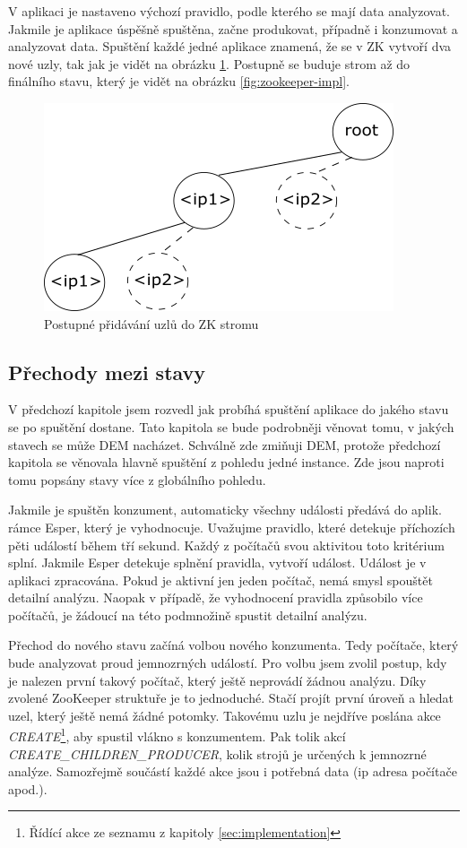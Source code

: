 \documentclass[
  digital, %
  table,   %
  nolof,     %
  nolot,     %
  oneside, %
  nocover,
  monochrome,
  12pt
]{fithesis3}
\begin{document}
V aplikaci je nastaveno výchozí pravidlo, podle kterého se mají data analyzovat. Jakmile je aplikace úspěšně spuštěna, začne produkovat, případně i konzumovat a analyzovat data. Spuštění každé jedné aplikace znamená, že se v ZK vytvoří dva nové uzly, tak jak je vidět na obrázku  \ref{fig:app-start}. Postupně se buduje strom až do finálního stavu, který je vidět na obrázku \ref{fig:zookeeper-impl}.

\begin{figure}[H]
	\centering
    \includegraphics[width=.4\linewidth, height=.18\textheight]{images/app-start.png}
    \caption{Postupné přidávání uzlů do ZK stromu}
    \label{fig:app-start}
\end{figure}

\subsection{Přechody mezi stavy}
V předchozí kapitole jsem rozvedl jak probíhá spuštění aplikace do jakého stavu se po spuštění dostane. Tato kapitola se bude podrobněji věnovat tomu, v jakých stavech se může DEM nacházet. Schválně zde zmiňuji DEM, protože předchozí kapitola se věnovala hlavně spuštění z pohledu jedné instance. Zde jsou naproti tomu popsány stavy více z globálního pohledu.

Jakmile je spuštěn konzument, automaticky všechny události předává do aplik. rámce Esper, který je vyhodnocuje. Uvažujme pravidlo, které detekuje příchozích pěti událostí během tří sekund. Každý z počítačů svou aktivitou toto kritérium splní. Jakmile Esper detekuje splnění pravidla, vytvoří událost. Událost je v aplikaci zpracována. Pokud je aktivní jen jeden počítač, nemá smysl spouštět detailní analýzu. Naopak v případě, že vyhodnocení pravidla způsobilo více počítačů, je žádoucí na této podmnožině spustit detailní analýzu.

Přechod do nového stavu začíná volbou nového konzumenta. Tedy počítače, který bude analyzovat proud jemnozrných událostí. Pro volbu jsem zvolil postup, kdy je nalezen první takový počítač, který ještě neprovádí žádnou analýzu. Díky zvolené ZooKeeper struktuře je to jednoduché. Stačí projít první úroveň a hledat uzel, který ještě nemá žádné potomky. Takovému uzlu je nejdříve poslána akce \textit{CREATE}\footnote{Řídící akce ze seznamu z kapitoly \ref{sec:implementation}}, aby spustil vlákno s konzumentem. Pak tolik akcí \\ \textit{CREATE\_CHILDREN\_PRODUCER}, kolik strojů je určených k jemnozrné analýze. Samozřejmě součástí každé akce jsou i potřebná data (ip adresa počítače apod.).
\end{document}
